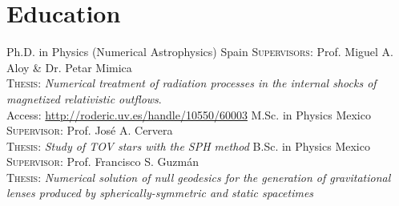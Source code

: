 \section{Education}

%
{\UVval}%
{Ph.D. in Physics (Numerical Astrophysics)}%
{}%
{Spain}%
{%
  \textsc{Supervisors}: Prof. Miguel A. Aloy \& Dr. Petar Mimica\\
  \textsc{Thesis}: \textit{Numerical treatment of radiation processes in the internal shocks of magnetized relativistic outflows}.\\
  Access: \url{http://roderic.uv.es/handle/10550/60003}%
}
%
{\UMSNHes}%
{M.Sc. in Physics}%
{}%
{Mexico}%
{%
  \textsc{Supervisor}: Prof. José A. Cervera\\
  \textsc{Thesis}: \textit{Study of TOV stars with the SPH method}%
}
%
{\UAEMes}{B.Sc. in Physics}%
{}%
{Mexico}%
{%
  \textsc{Supervisor}: Prof. Francisco S. Guzmán\\
  \textsc{Thesis}: \textit{Numerical solution of null geodesics for the generation of gravitational lenses produced by spherically-symmetric and static spacetimes}%
}
